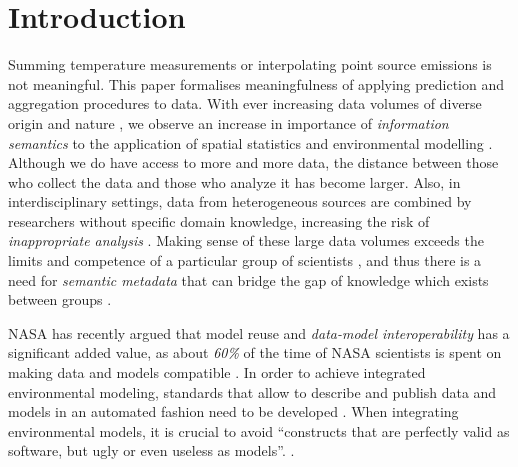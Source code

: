 \documentclass[final,authoryear,1p,times]{elsarticle}
\begin{document}


\section{Introduction} \label{intro}

Summing temperature measurements or interpolating point source emissions is not meaningful. This paper formalises meaningfulness of applying prediction and aggregation procedures to data. With ever increasing data volumes \citep{Bell2009} of diverse origin and nature \citep{Parsons2011}, we observe an increase in importance of {\em information semantics} to the application of spatial statistics and environmental modelling \citep{Villa2009}. Although we do have access to more and more data, the distance between those who collect the data and those who analyze it has become larger. Also, in interdisciplinary settings, data from heterogeneous sources are combined by researchers without specific domain knowledge, increasing the risk of {\em inappropriate analysis} \citep{Pebesma2011}. Making sense of these large data volumes exceeds the limits and competence of a particular group of scientists \citep{Weinberger011}, and thus there is a need for \textit{semantic metadata} that can bridge the gap of knowledge which exists between groups \citep{Gray.2005}. 

NASA has recently argued that model reuse and \textit{data-model interoperability} has a significant added value, as about \textit{60\% }of the time of NASA scientists is spent on making data and models compatible \citep{NASA.2011}. In order to achieve integrated environmental modeling, standards that allow to describe and publish data and models in an automated fashion need to be developed \citep{Laniak2013}. When integrating environmental models, it is crucial to avoid ``constructs that are perfectly valid as software, but ugly or even useless as models''. \citep[p.149]{Voinov2013}. 
\end{document}
